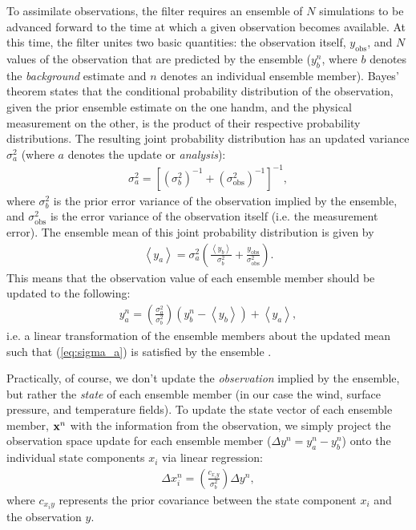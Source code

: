 To assimilate observations, the filter requires an ensemble of $N$ simulations to be advanced forward to the time at which a given observation becomes available. 
At this time, the filter unites two basic quantities: the observation itself, $y_{\text{obs}}$, and $N$ values of the observation that are predicted by the ensemble ($y_{b}^{n}$, where $b$ denotes the \textit{background} estimate and $n$ denotes an individual ensemble member).
Bayes' theorem states that the conditional probability distribution of the observation, given the prior ensemble estimate on the one handm, and the physical measurement on the other, is the product of their respective probability distributions.
The resulting joint probability distribution has an updated variance $\sigma_a^2$  (where $a$ denotes the update or \textit{analysis}):
\begin{eqnarray}
 \sigma_a^2 = 
\left[
\left( \sigma_b^2  \right)^{-1}+
\left( \sigma_{\text{obs}}^2  \right)^{-1}
\right]^{-1},
\label{eq:sigma_a}
\end{eqnarray}
where $\sigma_b^2$ is  the prior error variance of the observation implied by the ensemble, and $\sigma_{\text{obs}}^2$ is the error variance of the observation itself (i.e. the measurement error).
The ensemble mean of this joint probability distribution is given by
\begin{eqnarray}
\left< y_a \right> = \sigma_a^2 
\left(
\frac{\left< y_b \right>}{\sigma_b^2} +
\frac{y_{\text{obs}} }{\sigma_{\text{obs}}^2} 
\right).
\end{eqnarray}
This means that the observation value of each ensemble member should be updated to the following:
\begin{eqnarray}
 y_{a}^n = 
\left( \frac{\sigma_a^2}{\sigma_b^2}  \right)
\left(
y_{b}^n - \left< y_b  \right> \right)
+ \left< y_a \right>,
\end{eqnarray}
i.e. a linear transformation of the ensemble members about the updated mean such that (\ref{eq:sigma_a}) is satisfied by the ensemble \citep{andersoncollins2006}.

Practically, of course, we don't update the \textit{observation} implied by the ensemble, but rather the \textit{state} of each ensemble member (in our case the wind, surface pressure, and temperature fields). 
To update the state vector of each ensemble member, ${\bf x}^n$ with the information from the observation, we simply project the observation space update for each ensemble member ($\Delta y^n = y_{a}^n-y_{b}^n$) onto the individual state components $x_i$ via linear regression:
\begin{eqnarray}
 \Delta x_{i}^n = 
\left(
\frac{c_{x_iy}}{\sigma_b^2}
\right)
\Delta y^n,
\label{eq:state_update}
\end{eqnarray}
where $c_{x_iy}$ represents the prior covariance between the state component $x_i$ and the observation $y$.

